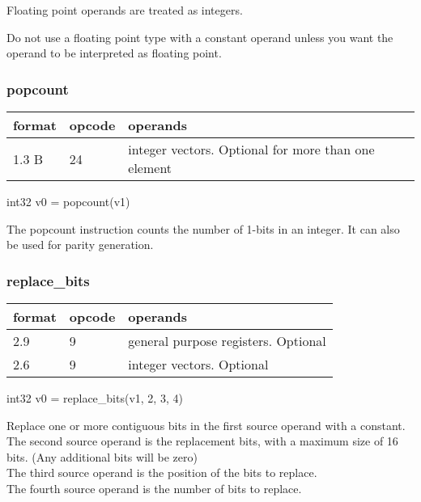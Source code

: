 \documentclass[forwardcom.tex]{subfiles}
\begin{document}
Floating point operands are treated as integers.

Do not use a floating point type with a constant operand unless you want the operand to be interpreted as floating point.


\subsubsection{popcount}
\label{table:popcountInstruction}
\begin{tabular}{|p{12mm}|p{12mm}|p{110mm}|}
\hline
\bfseries format & \bfseries opcode & \bfseries operands \\ \hline
1.3 B & 24 & integer vectors. Optional for more than one element \\ \hline
\end{tabular}
\vspace{2mm}

int32 v0 = popcount(v1)
\vspace{2mm}

The popcount instruction counts the number of 1-bits in an integer. It can also be used for parity generation.

\subsubsection{replace\_bits}
\label{table:replaceBitsInstruction}
\begin{tabular}{|p{12mm}|p{12mm}|p{110mm}|}
\hline
\bfseries format & \bfseries opcode & \bfseries operands \\ \hline
2.9 & 9 & general purpose registers. Optional \\ \hline
2.6 & 9 & integer vectors. Optional \\ \hline
\end{tabular}
\vspace{2mm}

int32 v0 = replace\_bits(v1, 2, 3, 4) 
\vspace{2mm}

Replace one or more contiguous bits in the first source operand with a constant.\\
The second source operand is the replacement bits, with a maximum size of 16 bits. (Any additional bits will be zero)\\
The third source operand is the position of the bits to replace.\\
The fourth source operand is the number of bits to replace.
\vspace{2mm}
\end{document}
